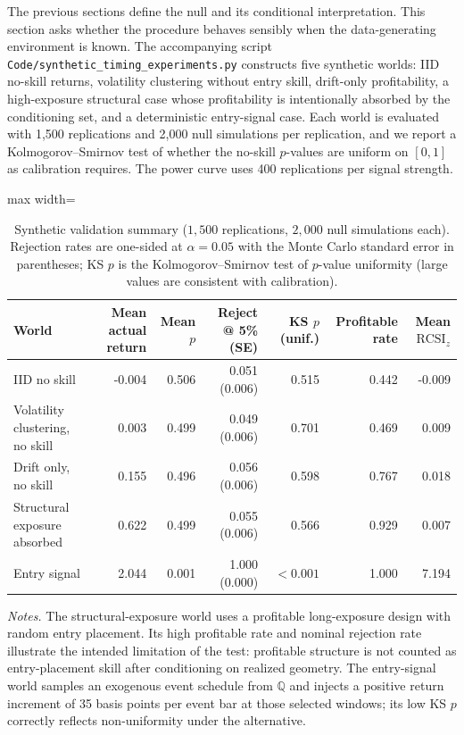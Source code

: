 \documentclass[preprint,12pt]{elsarticle}
\theoremstyle{definition}
\begin{document}
The previous sections define the null and its conditional interpretation. This section asks whether the procedure behaves sensibly when the data-generating environment is known. The accompanying script \texttt{Code/synthetic\_timing\_experiments.py} constructs five synthetic worlds: IID no-skill returns, volatility clustering without entry skill, drift-only profitability, a high-exposure structural case whose profitability is intentionally absorbed by the conditioning set, and a deterministic entry-signal case. Each world is evaluated with 1{,}500 replications and 2{,}000 null simulations per replication, and we report a Kolmogorov--Smirnov test of whether the no-skill $p$-values are uniform on $[0,1]$ as calibration requires. The power curve uses 400 replications per signal strength.

\begin{table}[H]
\centering
\caption{Synthetic validation summary ($1{,}500$ replications, $2{,}000$ null simulations each). Rejection rates are one-sided at $\alpha=0.05$ with the Monte Carlo standard error in parentheses; KS $p$ is the Kolmogorov--Smirnov test of $p$-value uniformity (large values are consistent with calibration).}
\label{tab:synthetic_validation}
{\small
\renewcommand{\arraystretch}{1.12}
\begin{adjustbox}{max width=\textwidth}
\begin{tabular}{@{}lrrrrrr@{}}
\toprule
World & Mean actual return & Mean $p$ & Reject @ 5\% (SE) & KS $p$ (unif.) & Profitable rate & Mean $\mathrm{RCSI}_z$ \\
\midrule
IID no skill & -0.004 & 0.506 & 0.051 (0.006) & 0.515 & 0.442 & -0.009 \\
Volatility clustering, no skill & \phantom{-}0.003 & 0.499 & 0.049 (0.006) & 0.701 & 0.469 & \phantom{-}0.009 \\
Drift only, no skill & \phantom{-}0.155 & 0.496 & 0.056 (0.006) & 0.598 & 0.767 & \phantom{-}0.018 \\
Structural exposure absorbed & \phantom{-}0.622 & 0.499 & 0.055 (0.006) & 0.566 & 0.929 & \phantom{-}0.007 \\
Entry signal & \phantom{-}2.044 & 0.001 & 1.000 (0.000) & $<0.001$ & 1.000 & \phantom{-}7.194 \\
\bottomrule
\end{tabular}
\end{adjustbox}
}
\par\vspace{0.5em}
\begin{minipage}{0.95\textwidth}
\centering
\footnotesize\emph{Notes.} The structural-exposure world uses a profitable long-exposure design with random entry placement. Its high profitable rate and nominal rejection rate illustrate the intended limitation of the test: profitable structure is not counted as entry-placement skill after conditioning on realized geometry. The entry-signal world samples an exogenous event schedule from $\mathbb{Q}$ and injects a positive return increment of 35 basis points per event bar at those selected windows; its low KS $p$ correctly reflects non-uniformity under the alternative.
\end{minipage}
\end{table}
\end{document}
